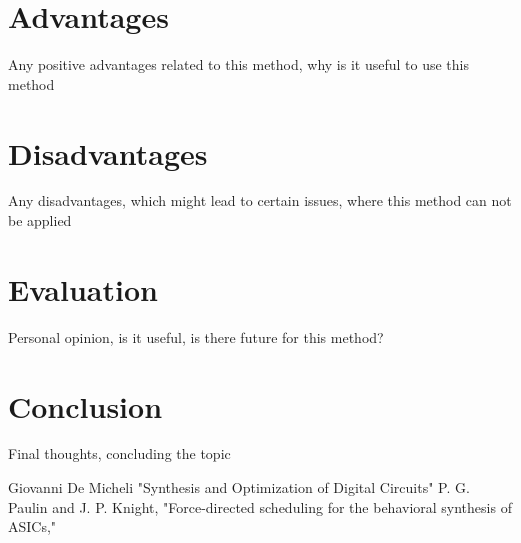 \documentclass[conference]{IEEEtran}
\begin{document}
\section{Advantages}
Any positive advantages related to this method, why is it useful to use this method

\section{Disadvantages}
Any disadvantages, which might lead to certain issues, where this method can not be applied

\section{Evaluation}
Personal opinion, is it useful, is there future for this method?

\section{Conclusion}
Final thoughts, concluding the topic

\begin{thebibliography}{00}
Giovanni De Micheli "Synthesis and Optimization of Digital Circuits"
P. G. Paulin and J. P. Knight, "Force-directed scheduling for the behavioral synthesis of ASICs,"
\end{thebibliography}
\end{document}
